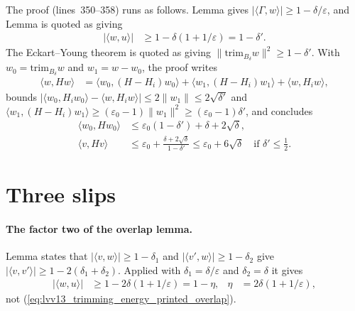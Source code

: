 \documentclass{article}
\begin{document}
The proof (lines~350--358) runs as follows. Lemma
 gives $|\langle\Gamma,w\rangle|\ge
1-\delta/\varepsilon$, and Lemma  is quoted as giving
\begin{align}
    |\langle w,u\rangle| & \ge1-\delta(1+1/\varepsilon)=1-\delta'.
    \label{eq:lvv13_trimming_energy_printed_overlap}
\end{align}
The Eckart--Young theorem is quoted as giving
$\|\mathrm{trim}_{B_\delta}w\|^2\ge1-\delta'$. With
$w_0=\mathrm{trim}_{B_\delta}w$ and $w_1=w-w_0$, the proof writes
\begin{align}
    \langle w,Hw\rangle & =\langle w_0,(H-H_i)w_0\rangle
    +\langle w_1,(H-H_i)w_1\rangle+\langle w,H_iw\rangle,
    \label{eq:lvv13_trimming_energy_split}
\end{align}
bounds $|\langle w_0,H_iw_0\rangle-\langle w,H_iw\rangle|\le2\|w_1\|\le
2\sqrt{\delta'}$ and $\langle w_1,(H-H_i)w_1\rangle\ge(\varepsilon_0-1)
\|w_1\|^2\ge(\varepsilon_0-1)\delta'$, and concludes
\begin{align}
    \langle w_0,Hw_0\rangle & \le\varepsilon_0(1-\delta')+\delta+2\sqrt\delta,
    \label{eq:lvv13_trimming_energy_printed_w0}                        \\
    \langle v,Hv\rangle     & \le\varepsilon_0
    +\frac{\delta+2\sqrt\delta}{1-\delta'}
    \le\varepsilon_0+6\sqrt\delta\quad\text{if }\delta'\le\tfrac12.
    \label{eq:lvv13_trimming_energy_printed}
\end{align}

\section{Three slips}

\paragraph{The factor two of the overlap lemma.} Lemma 
states that $|\langle v,w\rangle|\ge1-\delta_1$ and $|\langle v',w\rangle|\ge
1-\delta_2$ give $|\langle v,v'\rangle|\ge1-2(\delta_1+\delta_2)$. Applied
with $\delta_1=\delta/\varepsilon$ and $\delta_2=\delta$ it gives
\begin{align}
    |\langle w,u\rangle| & \ge1-2\delta(1+1/\varepsilon)=1-\eta,
     & \eta & =2\delta(1+1/\varepsilon),
    \label{eq:lvv13_trimming_energy_overlap}
\end{align}
not (\ref{eq:lvv13_trimming_energy_printed_overlap}).
\end{document}
